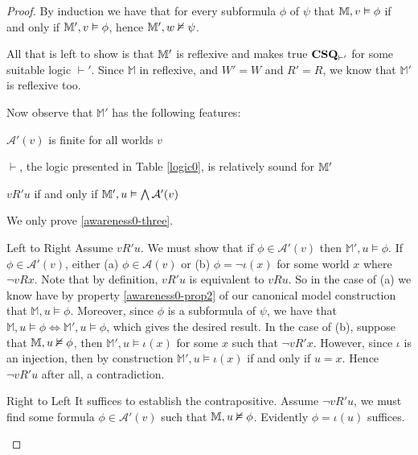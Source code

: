 \begin{proof}
  By induction we have that for every subformula $\phi$ of $\psi$ that
  $\mathbbm{M}, v \vDash \phi$ if and only if $\mathbbm{M}', v \vDash \phi$,
  hence $\mathbbm{M}', w \nvDash \psi$.  %
    
  All that is left to show is that $\mathbbm{M}'$ is reflexive and
  makes true $\text{\tmtextbf{CSQ}}_{\vdash'}$ for some suitable logic
  $\vdash'$.  Since $\mathbb{M}$ in reflexive, and $W' =
  W$ and $R' = R$, we know that $\mathbb{M}'$ is reflexive too.
  
  Now observe that $\mathbb{M}'$ has the following features:
  \begin{enumerateroman}
    \item \label{awareness0-one} $\mathcal{A}'(v)$ is finite for all worlds $v$
    \item \label{awareness0-two} $\vdash$, the logic presented in Table \ref{logic0}, is
      relatively sound for $\mathbbm{M}'$
    \item\label{awareness0-three}  $v R' u$ if and only if $\mathbbm{M}', u \vDash \bigwedge
    \mathcal{A}'(v)$
  \end{enumerateroman}

   We only prove \eqref{awareness0-three}.

  \begin{descriptiondash}
   \item[Left to Right]  Assume $v R' u$. We must show that if
   $\phi \in \mathcal{A}'(v)$ then $\mathbb{M}', u \models \phi$.  If
   $\phi \in \mathcal{A}'(v)$, either (a) $\phi \in \mathcal{A}(v)$ or
   (b) $\phi = \neg \iota(x)$ for some world $x$ where $\neg v R x$. Note
   that by definition, $v R' u$ is equivalent to $v R u$.  So in the
   case of (a) we know have by property \eqref{awareness0-prop2} of
   our canonical model construction that $\mathbb{M}, u \models \phi$.
   Moreover, since $\phi$ is a subformula of $\psi$, we have that
   $\mathbb{M},u \models \phi \iff \mathbb{M}',u \models \phi$, which
   gives the desired result.  In the case of (b),
   suppose that $\mathbb{M},u \nmodels \phi$, then $\mathbb{M}',u
   \models \iota(x)$ for some $x$ such that $\neg v R' x$.  However,
   since $\iota$ is an injection, then by construction $\mathbb{M}',u
   \models \iota(x)$ if and only if $u = x$.  Hence $\neg v R' u$ after
   all, a contradiction.
  
   \item[Right to Left] It suffices to establish the contrapositive.  Assume $\neg v R' u$,
   we must find some formula $\phi \in \mathcal{A}'(v)$ such that
   $\mathbb{M}, u \nmodels \phi$.  Evidently $\phi = \iota(u)$ suffices.
 \end{descriptiondash}
  

\end{proof}
